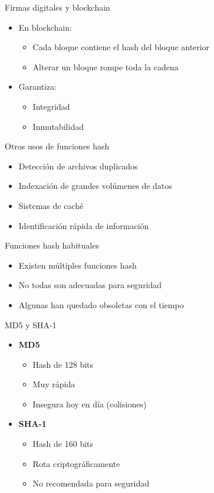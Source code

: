 \documentclass{beamer}
\begin{document}
\begin{frame}{Firmas digitales y blockchain}
\begin{itemize}
  \item En blockchain:
  \begin{itemize}
    \item Cada bloque contiene el hash del bloque anterior
    \item Alterar un bloque rompe toda la cadena
  \end{itemize}
  \item Garantiza:
  \begin{itemize}
    \item Integridad
    \item Inmutabilidad
  \end{itemize}
\end{itemize}
\end{frame}

\begin{frame}{Otros usos de funciones hash}
\begin{itemize}
  \item Detección de archivos duplicados
  \item Indexación de grandes volúmenes de datos
  \item Sistemas de caché
  \item Identificación rápida de información
\end{itemize}
\end{frame}

\begin{frame}{Funciones hash habituales}
\begin{itemize}
  \item Existen múltiples funciones hash
  \item No todas son adecuadas para seguridad
  \item Algunas han quedado obsoletas con el tiempo
\end{itemize}
\end{frame}

\begin{frame}{MD5 y SHA-1}
\begin{itemize}
  \item \textbf{MD5}
  \begin{itemize}
    \item Hash de 128 bits
    \item Muy rápida
    \item Insegura hoy en día (colisiones)
  \end{itemize}
  \item \textbf{SHA-1}
  \begin{itemize}
    \item Hash de 160 bits
    \item Rota criptográficamente
    \item No recomendada para seguridad
  \end{itemize}
\end{itemize}
\end{frame}
\end{document}
